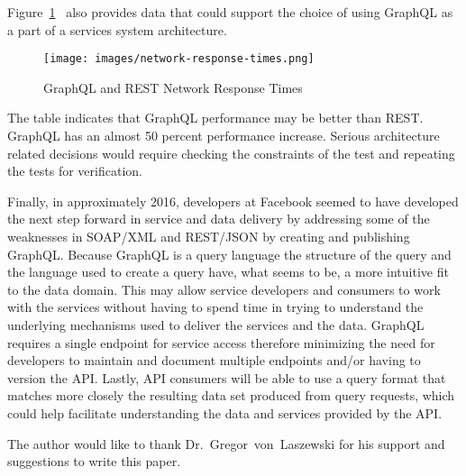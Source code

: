 Figure~\ref{f:network-response}~\cite{hid505VzquezIngelmo2017ImprovingTO} also 
provides data that could support the choice of using GraphQL as a part of a 
services system architecture.  
\begin{figure}[!ht]
  \centering\texttt{[image: images/network-response-times.png]}
  \caption{GraphQL and REST Network Response Times}\label{f:network-response}
\end{figure}
The table indicates that GraphQL performance may be better than REST.  GraphQL 
has an almost 50 percent performance increase.  Serious architecture related 
decisions would require checking the constraints of the test and repeating the 
tests for verification.

Finally, in approximately 2016, developers at Facebook seemed to have 
developed the next step forward in service and data delivery by addressing some 
of the weaknesses in SOAP/XML and REST/JSON by creating and publishing GraphQL.
Because GraphQL is a query language the structure of the query and the language 
used to create a query have, what seems to be, a more intuitive fit to the data 
domain.  This may allow service developers and consumers to work with the 
services without having to spend time in trying to understand the underlying 
mechanisms used to deliver the services and the data.  GraphQL requires a 
single endpoint for service access therefore minimizing the need for developers 
to maintain and document multiple endpoints and/or having to version the API.  
Lastly, API consumers will be able to use a query format that matches more 
closely the resulting data set produced from query requests, which could help 
facilitate understanding the data and services provided by the API.

\begin{acks}

  The author would like to thank Dr.~Gregor~von~Laszewski for his
  support and suggestions to write this paper.

\end{acks}


 
